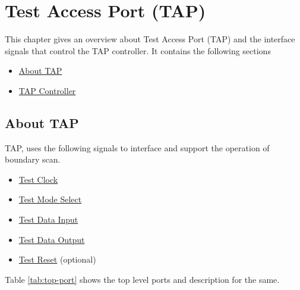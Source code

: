 \chapter{Test Access Port (TAP)}
\label{chap:TAP}

This chapter gives an overview about Test Access Port (TAP) and the interface signals that control the TAP controller. It contains the following sections 

\begin{itemize}
    \item \hyperref[sec:about-tap]{About TAP}
    \item \hyperref[sec:tap-controller]{TAP Controller}
\end{itemize}
\newpage

\section{About TAP}
\label{sec:about-tap}

TAP, uses the following signals to interface and support the operation of boundary scan.
\begin{itemize}
    \item \hyperref[subsec:tck]{Test Clock}
    \item \hyperref[subsec:tms]{Test Mode Select}
    \item \hyperref[subsec:tdi]{Test Data Input}
    \item \hyperref[subsec:tdo]{Test Data Output}
    \item \hyperref[subsec:trst]{Test Reset} (optional)
\end{itemize}

Table \ref{tab:top-port} shows the top level ports and description for the same.


